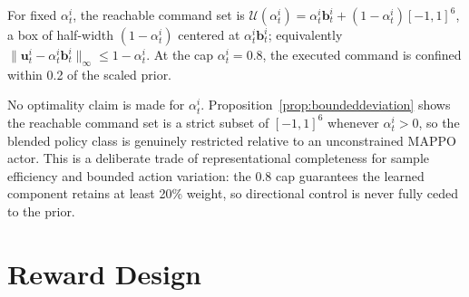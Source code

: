 \begin{proposition}\label{prop:boundeddeviation}
For fixed $\alpha_t^i$, the reachable command set is $\mathcal{U}(\alpha_t^i) = \alpha_t^i \mathbf{b}_t^i +
(1-\alpha_t^i)[-1,1]^6$, a box of half-width $(1-\alpha_t^i)$ centered at $\alpha_t^i \mathbf{b}_t^i$;
equivalently $\lVert \mathbf{u}_t^i - \alpha_t^i \mathbf{b}_t^i \rVert_\infty \le 1 - \alpha_t^i$. At the cap
$\alpha_t^i=0.8$, the executed command is confined within 0.2 of the scaled prior.
\end{proposition}

No optimality claim is made for $\alpha_t^i$. Proposition~\ref{prop:boundeddeviation} shows the
reachable command set is a strict subset of $[-1,1]^6$ whenever $\alpha_t^i > 0$, so the blended policy
class is genuinely restricted relative to an unconstrained MAPPO actor. This is a deliberate trade of
representational completeness for sample efficiency and bounded action variation: the 0.8 cap
guarantees the learned component retains at least 20\% weight, so directional control is never fully
ceded to the prior.

\section{Reward Design}\label{sec:alpha_reward}

